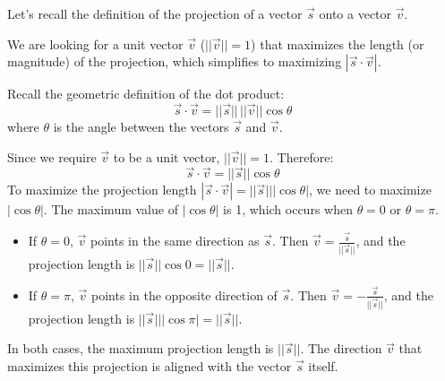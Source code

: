 \documentclass{report}
\begin{document}

\sol
Let's recall the definition of the projection of a vector $\vec{s}$ onto a vector $\vec{v}$.


We are looking for a unit vector $\vec{v}$ ($||\vec{v}||=1$) that maximizes the length (or magnitude) of the projection, which simplifies to maximizing $|\vec{s} \cdot \vec{v}|$.

Recall the geometric definition of the dot product:
\[
	\vec{s} \cdot \vec{v} = ||\vec{s}|| \, ||\vec{v}|| \cos \theta
\]
where $\theta$ is the angle between the vectors $\vec{s}$ and $\vec{v}$.

Since we require $\vec{v}$ to be a unit vector, $||\vec{v}||=1$. Therefore:
\[
	\vec{s} \cdot \vec{v} = ||\vec{s}|| \cos \theta
\]
To maximize the projection length $|\vec{s} \cdot \vec{v}| = ||\vec{s}|| |\cos \theta|$, we need to maximize $|\cos \theta|$. The maximum value of $|\cos \theta|$ is 1, which occurs when $\theta = 0$ or $\theta = \pi$.
\begin{itemize}
	\item If $\theta = 0$, $\vec{v}$ points in the same direction as $\vec{s}$. Then $\vec{v} = \frac{\vec{s}}{||\vec{s}||}$, and the projection length is $||\vec{s}|| \cos 0 = ||\vec{s}||$.
	\item If $\theta = \pi$, $\vec{v}$ points in the opposite direction of $\vec{s}$. Then $\vec{v} = -\frac{\vec{s}}{||\vec{s}||}$, and the projection length is $||\vec{s}|| |\cos \pi| = ||\vec{s}||$.
\end{itemize}
In both cases, the maximum projection length is $||\vec{s}||$. The direction $\vec{v}$ that maximizes this projection is aligned with the vector $\vec{s}$ itself.
\end{document}
